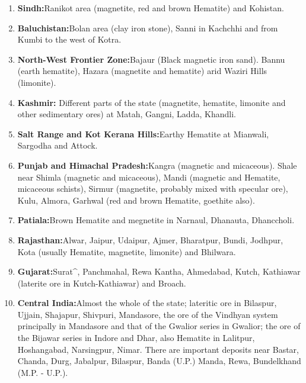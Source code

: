 \begin{enumerate}
\item \textbf{Sindh:}Ranikot area (magnetite, red and brown Hematite) and Kohistan.

 \item \textbf{Baluchistan:}Bolan area (clay iron stone), Sanni in Kachchhi and from Kumbi to the west of Kotra.

 \item \textbf{North-West Frontier Zone:}Bajaur (Black magnetic iron sand). Bannu (earth hematite), Hazara (magnetite and hematite) arid Waziri Hills (limonite).

 \item \textbf{Kashmir:} Different parts of the state (magnetite, hematite, limonite and other sedimentary ores) at Matah, Gangni, Ladda, Khandli.

 \item \textbf{Salt Range and Kot Kerana Hills:}Earthy Hematite at Mianwali, Sargodha and Attock.

 \item \textbf{Punjab and Himachal Pradesh:}Kangra (magnetic and micaceous). Shale near Shimla (magnetic and micaceous), Mandi (magnetic and Hematite, micaceous schists), Sirmur (magnetite, probably mixed with specular ore), Kulu, Almora, Garhwal (red and brown Hematite, goethite also).

 \item \textbf{Patiala:}Brown Hematite and megnetite in Narnaul, Dhanauta, Dhanccholi.

 \item \textbf{Rajasthan:}Alwar, Jaipur, Udaipur, Ajmer, Bharatpur, Bundi, Jodhpur, Kota (usually Hematite, magnetite, limonite) and Bhilwara.

 \item \textbf{Gujarat:}Surat^, Panchmahal, Rewa Kantha, Ahmedabad, Kutch, Kathiawar (laterite ore in Kutch-Kathiawar) and Broach.

 \item \textbf{Central India:}Almost the whole of the state; lateritic ore in Bilaspur, Ujjain, Shajapur, Shivpuri, Mandasore, the ore of the Vindhyan system principally in Mandasore and that of the Gwalior series in Gwalior; the ore of the Bijawar series in Indore and Dhar, also Hematite in Lalitpur, Hoshangabad, Narsingpur, Nimar. There are important deposits near Bastar, Chanda, Durg, Jabalpur, Bilaspur, Banda (U.P.) Manda, Rewa, Bundelkhand (M.P. - U.P.).


\end{enumerate}
